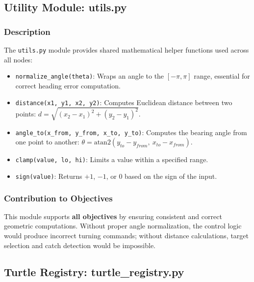 \documentclass[12pt,a4paper]{article}
\begin{document}
\subsection{Utility Module: utils.py}
\label{subsec:utils}

\subsubsection{Description}

The \texttt{utils.py} module provides shared mathematical helper functions used across all nodes:

\begin{itemize}
  \item \texttt{normalize\_angle(theta)}: Wraps an angle to the $[-\pi, \pi]$ range, essential for correct heading error computation.
  \item \texttt{distance(x1, y1, x2, y2)}: Computes Euclidean distance between two points: $d = \sqrt{(x_2 - x_1)^2 + (y_2 - y_1)^2}$.
  \item \texttt{angle\_to(x\_from, y\_from, x\_to, y\_to)}: Computes the bearing angle from one point to another: $\theta = \text{atan2}(y_{to} - y_{from},\ x_{to} - x_{from})$.
  \item \texttt{clamp(value, lo, hi)}: Limits a value within a specified range.
  \item \texttt{sign(value)}: Returns $+1$, $-1$, or $0$ based on the sign of the input.
\end{itemize}

\subsubsection{Contribution to Objectives}

This module supports \textbf{all objectives} by ensuring consistent and correct geometric computations. Without proper angle normalization, the control logic would produce incorrect turning commands; without distance calculations, target selection and catch detection would be impossible.

\subsection{Turtle Registry: turtle\_registry.py}
\label{subsec:registry}
\end{document}
